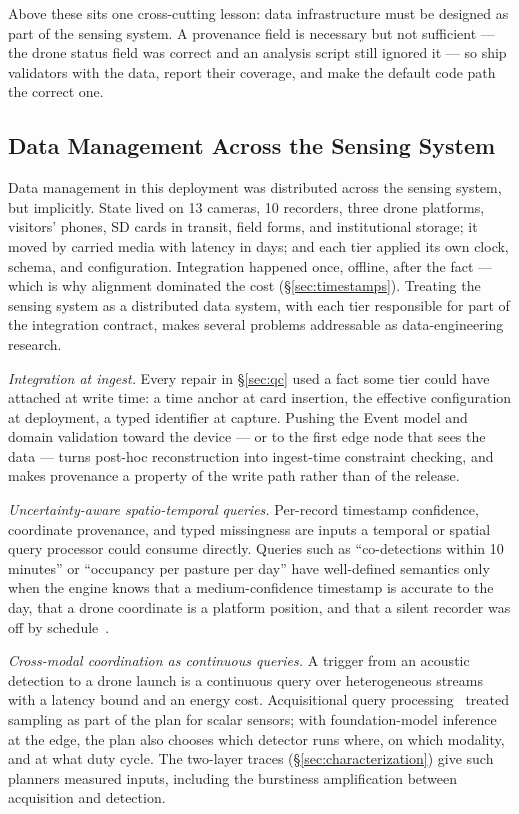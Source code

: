 \documentclass[sigconf]{acmart}
\begin{document}
Above these sits one cross-cutting lesson: data infrastructure must be
designed as part of the sensing system. A provenance field is necessary
but not sufficient --- the drone status field was correct and an
analysis script still ignored it --- so ship validators with the data, report their coverage, and
make the default code path the correct one.

\subsection{Data Management Across the Sensing System}
\label{sec:distributed}

Data management in this deployment was distributed across the sensing
system, but implicitly. State lived on 13 cameras, 10 recorders, three
drone platforms, visitors' phones, SD cards in transit, field forms,
and institutional storage; it moved by carried media with latency in
days; and each tier applied its own clock, schema, and configuration.
Integration happened once, offline, after the fact --- which is why
alignment dominated the cost (\S\ref{sec:timestamps}). Treating the
sensing system as a distributed data system, with each tier responsible
for part of the integration contract, makes several problems
addressable as data-engineering research.

\emph{Integration at ingest.} Every repair in \S\ref{sec:qc} used a
fact some tier could have attached at write time: a time anchor at card
insertion, the effective configuration at deployment, a typed identifier
at capture. Pushing the Event model and domain validation toward the
device --- or to the first edge node that sees the data --- turns
post-hoc reconstruction into ingest-time constraint checking, and makes
provenance a property of the write path rather than of the release.

\emph{Uncertainty-aware spatio-temporal queries.} Per-record timestamp
confidence, coordinate provenance, and typed missingness are inputs a
temporal or spatial query processor could consume directly. Queries
such as ``co-detections within 10 minutes'' or ``occupancy per pasture
per day'' have well-defined semantics only when the engine knows that a
medium-confidence timestamp is accurate to the day, that a drone
coordinate is a platform position, and that a silent recorder was off
by schedule~\cite{jensen1999temporal}.

\emph{Cross-modal coordination as continuous queries.} A trigger from an
acoustic detection to a drone launch is a continuous query over
heterogeneous streams with a latency bound and an energy cost.
Acquisitional query processing~\cite{madden2005tinydb,deshpande2004model}
treated sampling as part of the plan for scalar sensors; with
foundation-model inference at the edge, the plan also chooses which
detector runs where, on which modality, and at what duty cycle.
The two-layer traces (\S\ref{sec:characterization}) give such planners
measured inputs, including the burstiness amplification between
acquisition and detection.
\end{document}
